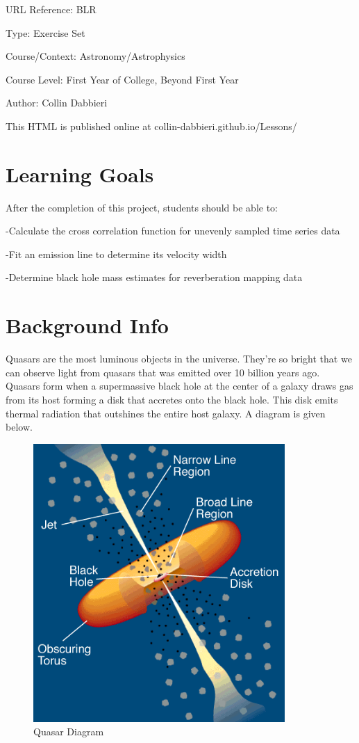 \documentclass[]{article}
\begin{document}
URL Reference: BLR

Type: Exercise Set

Course/Context: Astronomy/Astrophysics

Course Level: First Year of College, Beyond First Year

Author: Collin Dabbieri

This HTML is published online at collin-dabbieri.github.io/Lessons/

\hypertarget{learning-goals}{%
\section{Learning Goals}\label{learning-goals}}

After the completion of this project, students should be able to:

-Calculate the cross correlation function for unevenly sampled time
series data

-Fit an emission line to determine its velocity width

-Determine black hole mass estimates for reverberation mapping data

\hypertarget{background-info}{%
\section{Background Info}\label{background-info}}

Quasars are the most luminous objects in the universe. They're so bright
that we can observe light from quasars that was emitted over 10 billion
years ago. Quasars form when a supermassive black hole at the center of
a galaxy draws gas from its host forming a disk that accretes onto the
black hole. This disk emits thermal radiation that outshines the entire
host galaxy. A diagram is given below.

\begin{figure}
\centering
\includegraphics[width=\textwidth,height=4.16667in]{./agn_model.gif}
\caption{Quasar Diagram}
\end{figure}
\end{document}
